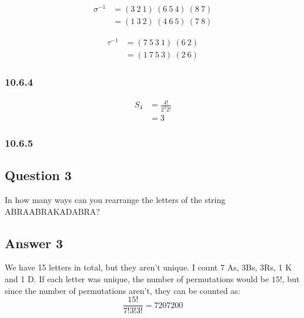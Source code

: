 \documentclass{article}
\begin{document}
	\[
	\begin{split}
	\sigma^{-1} & = (3 \ 2 \ 1) \ (6 \ 5 \ 4) \ (8 \ 7) \\
	& = (1 \ 3 \ 2) \ (4 \ 6 \ 5) \ (7 \ 8)
	\end{split}
	\]
	
	\[
	\begin{split}
	\tau^{-1} & = (7 \ 5 \ 3 \ 1) \ (6 \ 2) \\
	& = (1 \ 7 \ 5 \ 3) \ (2 \ 6)
	\end{split}
	\]
	
	\subsubsection*{10.6.4}
	\[
	\begin{split}
	S_4 & = \frac{4!}{2^{2}2!} \\
	& = 3
	\end{split}
	\]
	
	\subsubsection*{10.6.5}
	
	\subsection*{Question 3}
	In how many ways can you rearrange the letters of the string
	ABRAABRAKADABRA?
	
	
	
	
	
	\subsection*{Answer 3}
	We have 15 letters in total, but they aren't unique. I count 7 As, 3Bs, 3Rs, 1 K and 1 D.
	If each letter was unique, the number of permutations would be $15!$, but since the number of permutations aren't, they can be counted as:
	$$
	\frac{15!}{7!3!3!} = 7207200
	$$
\end{document}
